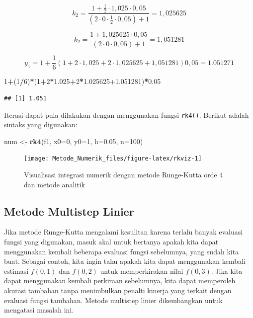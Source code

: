 \documentclass[]{book}
\newenvironment{Shaded}{\begin{snugshade}}{\end{snugshade}}
\newcommand{\DataTypeTok}[1]{\textcolor[rgb]{0.13,0.29,0.53}{#1}}
\newcommand{\DecValTok}[1]{\textcolor[rgb]{0.00,0.00,0.81}{#1}}
\newcommand{\FloatTok}[1]{\textcolor[rgb]{0.00,0.00,0.81}{#1}}
\newcommand{\KeywordTok}[1]{\textcolor[rgb]{0.13,0.29,0.53}{\textbf{#1}}}
\newcommand{\NormalTok}[1]{#1}
\newcommand{\OperatorTok}[1]{\textcolor[rgb]{0.81,0.36,0.00}{\textbf{#1}}}
\newcommand{\StringTok}[1]{\textcolor[rgb]{0.31,0.60,0.02}{#1}}
\theoremstyle{definition}
\theoremstyle{definition}
\theoremstyle{definition}
\theoremstyle{remark}
\begin{document}
\[
k_2=\frac{1+\frac{1}{2}\cdot1,025\cdot0,05}{\left(2\cdot 0\cdot\frac{1}{2}\cdot0,05\right)+1}=1,025625
\]

\[
k_2=\frac{1+1,025625\cdot0,05}{\left(2\cdot 0\cdot0,05\right)+1}=1,051281
\]

\[
y_1=1+\frac{1}{6}\left(1+2\cdot1,025+2\cdot1,025625+1,051281\right)0,05=1.051271
\]

\begin{Shaded}
\begin{Highlighting}[]
\DecValTok{1}\OperatorTok{+}\NormalTok{(}\DecValTok{1}\OperatorTok{/}\DecValTok{6}\NormalTok{)}\OperatorTok{*}\NormalTok{(}\DecValTok{1}\OperatorTok{+}\DecValTok{2}\OperatorTok{*}\FloatTok{1.025}\OperatorTok{+}\DecValTok{2}\OperatorTok{*}\FloatTok{1.025625+1.051281}\NormalTok{)}\OperatorTok{*}\FloatTok{0.05}
\end{Highlighting}
\end{Shaded}

\begin{verbatim}
## [1] 1.051
\end{verbatim}

Iterasi dapat pula dilakukan dengan menggunakan fungsi \texttt{rk4()}. Berikut adalah sintaks yang digunakan:

\begin{Shaded}
\begin{Highlighting}[]
\NormalTok{num <-}\StringTok{ }\KeywordTok{rk4}\NormalTok{(f1, }\DataTypeTok{x0=}\DecValTok{0}\NormalTok{, }\DataTypeTok{y0=}\DecValTok{1}\NormalTok{, }\DataTypeTok{h=}\FloatTok{0.05}\NormalTok{, }\DataTypeTok{n=}\DecValTok{100}\NormalTok{)}
\end{Highlighting}
\end{Shaded}

\begin{figure}

{\centering \texttt{[image: Metode\_Numerik\_files/figure-latex/rkviz-1]} 

}

\caption{Visualisasi integrasi numerik dengan metode Runge-Kutta orde 4 dan metode analitik}\label{fig:rkviz}
\end{figure}

\hypertarget{mml}{%
\subsection{Metode Multistep Linier}\label{mml}}

Jika metode Runge-Kutta mengalami kesulitan karena terlalu banyak evaluasi fungsi yang digunakan, masuk akal untuk bertanya apakah kita dapat menggunakan kembali beberapa evaluasi fungsi sebelumnya, yang sudah kita buat. Sebagai contoh, kita ingin tahu apakah kita dapat menggunakan kembali estimasi \(f\left(0,1\right)\) dan \(f\left(0,2\right)\) untuk memperkirakan nilai \(f\left(0,3\right)\). Jika kita dapat menggunakan kembali perkiraan sebelumnya, kita dapat memperoleh akurasi tambahan tanpa menimbulkan penalti kinerja yang terkait dengan evaluasi fungsi tambahan. Metode multistep linier dikembangkan untuk mengatasi masalah ini.
\end{document}
